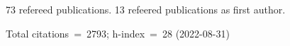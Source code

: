 73 refereed publications. 13 refeered publications as first author.

Total citations~=~2793; h-index~=~28 (2022-08-31)
